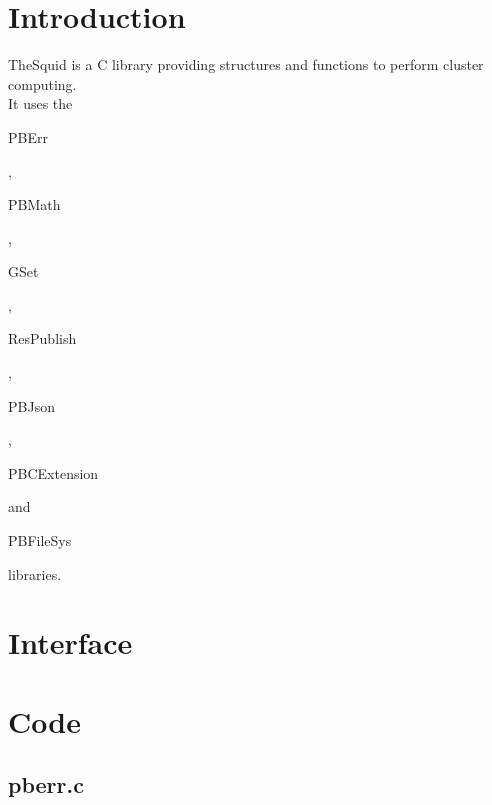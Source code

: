 \section*{Introduction}

TheSquid is a C library providing structures and functions to perform cluster computing.\\ 

It uses the \begin{ttfamily}PBErr\end{ttfamily}, \begin{ttfamily}PBMath\end{ttfamily}, \begin{ttfamily}GSet\end{ttfamily}, \begin{ttfamily}ResPublish\end{ttfamily}, \begin{ttfamily}PBJson\end{ttfamily}, \begin{ttfamily}PBCExtension\end{ttfamily} and \begin{ttfamily}PBFileSys\end{ttfamily} libraries.\\

\section{Interface}

\begin{scriptsize}
\begin{ttfamily}

\end{ttfamily}
\end{scriptsize}

\section{Code}

\subsection{pberr.c}

\begin{scriptsize}
\begin{ttfamily}

\end{ttfamily}
\end{scriptsize}

